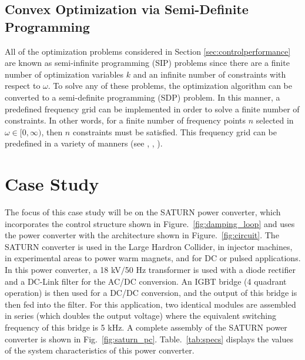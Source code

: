 \documentclass[a4paper, 10pt, conference]{ieeeconf}
\begin{document}
\subsection{Convex Optimization via Semi-Definite Programming}
All of the optimization problems considered in Section \ref{sec:controlperformance} are known as semi-infinite programming (SIP) problems since there are a finite number of optimization variables $k$ and an infinite number of constraints with respect to $\omega$. To solve any of these problems, the optimization algorithm can be converted to a semi-definite programming (SDP) problem. In this manner, a predefined frequency grid can be implemented in order to solve a finite number of constraints. In other words, for a finite number of frequency points $n$ selected in $\omega \in [0,\infty)$, then $n$ constraints must be satisfied. This frequency grid can be predefined in a variety of manners (see \cite{GKL10b}, \cite{SVBB11}, \cite{FR05}). 

\section{Case Study}
\label{sec:case}
The focus of this case study will be on the SATURN power converter, which incorporates the control structure shown in Figure.~\ref{fig:damping_loop} and uses the power converter with the architecture shown in Figure.~\ref{fig:circuit}. The SATURN converter is used in the Large Hardron Collider, in injector machines, in experimental areas to power warm magnets, and for DC or pulsed applications. In this power converter, a 18 kV$/$50 Hz transformer is used with a diode rectifier and a DC-Link filter for the AC/DC conversion. An IGBT bridge (4 quadrant operation) is then used for a DC/DC conversion, and the output of this bridge is then fed into the filter. For this application, two identical modules are assembled in series (which doubles the output voltage) where the equivalent switching frequency of this bridge is 5 kHz. A complete assembly of the SATURN power converter is shown in Fig.~\ref{fig:saturn_pc}. Table.~\ref{tab:specs} displays the values of the system characteristics of this power converter.
\end{document}
